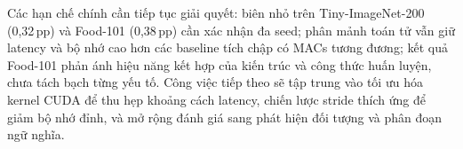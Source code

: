 \documentclass[conference]{IEEEtran}
\begin{document}
Các hạn chế chính cần tiếp tục giải quyết: biên nhỏ trên
Tiny-ImageNet-200 (0,32\,pp) và Food-101 (0,38\,pp) cần xác nhận
đa seed; phân mảnh toán tử vẫn giữ latency và bộ nhớ cao hơn các
baseline tích chập có MACs tương đương; kết quả Food-101 phản ánh
hiệu năng kết hợp của kiến trúc và công thức huấn luyện, chưa tách
bạch từng yếu tố. Công việc tiếp theo sẽ tập trung vào tối ưu hóa
kernel CUDA để thu hẹp khoảng cách latency, chiến lược stride thích
ứng để giảm bộ nhớ đỉnh, và mở rộng đánh giá sang phát hiện đối
tượng và phân đoạn ngữ nghĩa.




\end{document}
